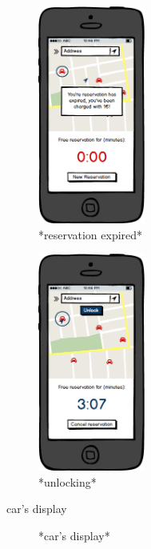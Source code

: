\documentclass[english]{article}
\begin{document}
\begin{figure}
	\centering
	\includegraphics[width=100pt]{mobile/FreeReservationEnded.png}
	\caption{*reservation expired*}
\end{figure}
\begin{figure}
	\centering
	\includegraphics[width=100pt]{mobile/Unlock.png}
	\caption{*unlocking*}
\end{figure}

car's display
\begin{figure}
	\centering
	\caption{*car's display*}
\end{figure}
\end{document}
